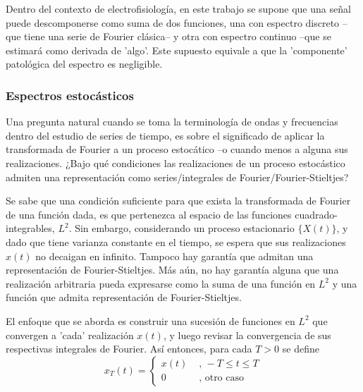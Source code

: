 \documentclass[12pt,a4paper]{mitthesis}
\begin{document}
Dentro del contexto de electrofisiolog\'ia, en este trabajo se supone que una se\~nal puede 
descomponerse como suma de dos funciones, una con espectro discreto --que tiene una serie de 
Fourier cl\'asica-- y otra con espectro continuo --que se estimar\'a como derivada de 'algo'. Este 
supuesto equivale a que la 'componente' patol\'ogica del espectro es negligible.


\subsubsection{Espectros estoc\'asticos}

Una pregunta natural cuando se toma la terminolog\'ia de ondas y frecuencias dentro del estudio de 
series de tiempo, es sobre el significado de aplicar la transformada de Fourier a un proceso 
estoc\'atico --o cuando menos a alguna sus realizaciones.
¿Bajo qu\'e condiciones las realizaciones de un proceso estoc\'astico admiten una representaci\'on
como series/integrales de Fourier/Fourier-Stieltjes?

Se sabe que una condici\'on suficiente para que exista la transformada de Fourier de una funci\'on
dada, es que pertenezca al espacio de las funciones cuadrado-integrables, $L^2$.
Sin embargo, considerando un proceso estacionario $\{ X(t) \}$, y dado que tiene varianza constante 
en el tiempo, se espera que sus realizaciones $x(t)$ no decaigan en infinito. Tampoco hay 
garant\'ia que admitan una representaci\'on de Fourier-Stieltjes. M\'as a\'un, no hay garant\'ia 
alguna que una realizaci\'on arbitraria pueda expresarse como la suma de una funci\'on en $L^2$ y 
una funci\'on que admita representaci\'on de Fourier-Stieltjes.

El enfoque que se aborda es construir una sucesi\'on de funciones en $L^{2}$ que convergen a 'cada' 
realizaci\'on $x(t)$, y luego revisar la convergencia de sus respectivas integrales de Fourier. 
As\'i entonces, para cada $T>0$ se define
\begin{equation}
x_T(t) = 
\begin{cases}
x(t) & \text{ , } -T\leq t \leq T \\
0 & \text{ , otro caso}
\end{cases}
\end{equation}
\end{document}
